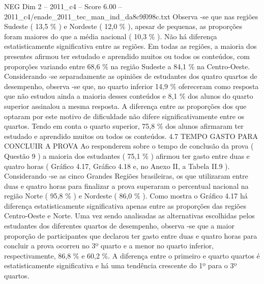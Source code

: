 \begin{textsample}{NEG Dim 2 – 2011\_c4 – Score 6.00 – 2011\_c4/enade\_2011\_tec\_man\_ind\_da8c9f098c.txt}
Observa -se que nas regiões Sudeste ( 13,5 \% ) e Nordeste ( 12,0 \% ), apesar de pequenas, as proporções foram maiores do que a média nacional ( 10,3 \% ).
Não há diferença estatisticamente significativa entre as regiões.
Em todas as regiões, a maioria dos presentes afirmou ter estudado e aprendido muitos ou todos os conteúdos, com proporções variando entre 68,6 \% na região Sudeste a 84,1 \% na Centro-Oeste.
Considerando -se separadamente as opiniões de estudantes dos quatro quartos de desempenho, observa -se que, no quarto inferior 14,9 \% ofereceram como resposta que não estudou ainda a maioria desses conteúdos e 8,1 \% dos alunos do quarto superior assinalou a mesma resposta.
A diferença entre as proporções dos que optaram por este motivo de dificuldade não difere significativamente entre os quartos.
Tendo em conta o quarto superior, 75,8 \% dos alunos afirmaram ter estudado e aprendido muitos ou todos os conteúdos. 4.7 TEMPO GASTO PARA CONCLUIR A PROVA Ao responderem sobre o tempo de conclusão da prova ( Questão 9 ) a maioria dos estudantes ( 75,1 \% ) afirmou ter gasto entre duas e quatro horas ( Gráfico 4.17, Gráfico 4.18 e, no Anexo II, a Tabela II.9 ).
Considerando -se as cinco Grandes Regiões brasileiras, os que utilizaram entre duas e quatro horas para finalizar a prova superaram o percentual nacional na região Norte ( 95,8 \% ) e Nordeste ( 86,0 \% ).
Como mostra o Gráfico 4.17 há diferença estatisticamente significativa apenas entre as proporções das regiões Centro-Oeste e Norte.
Uma vez sendo analisadas as alternativas escolhidas pelos estudantes dos diferentes quartos de desempenho, observa -se que a maior proporção de participantes que declarou ter gasto entre duas e quatro horas para concluir a prova ocorreu no 3º quarto e a menor no quarto inferior, respectivamente, 86,8 \% e 60,2 \%.
A diferença entre o primeiro e quarto quartos é estatisticamente significativa e há uma tendência crescente do 1º para o 3º quartos.

\end{textsample}
